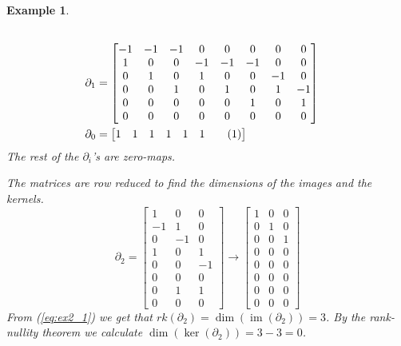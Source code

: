 \documentclass[11pt,a4paper,twoside]{report}
\newtheorem{myex}[mythm]{Example}
\newcommand\numberthis{\addtocounter{equation}{1}\tag{\theequation}}
\DeclareMathOperator{\im}{im}
\begin{document}
\begin{myex}
\begin{align*}
\\
\partial_1&=
\begin{bmatrix}
-1 & -1 & -1 & 0 & 0 & 0 & 0 & 0 \\
1 & 0 & 0 & -1 & -1 & -1 & 0 & 0 \\
0 & 1 & 0 & 1 & 0 & 0 & -1 & 0 \\
0 & 0 & 1 & 0 & 1 & 0 & 1 & -1 \\
0 & 0 & 0 & 0 & 0 & 1 & 0 & 1 \\
0 & 0 & 0 & 0 & 0 & 0 & 0 & 0 
\end{bmatrix}
\\
\partial_0&=
\begin{bmatrix}
1 & 1 & 1 & 1 & 1 & 1 \numberthis \label{eq:ex2_0}
\end{bmatrix}
\end{align*} 
The rest of the $\partial_i$'s are zero-maps.

The matrices are row reduced to find the dimensions of the images and the kernels.
\begin{equation}\label{eq:ex2_1}
\partial_2=
\begin{bmatrix}
1 & 0 & 0 \\
-1 & 1 & 0 \\
0 & -1 & 0 \\
1 & 0 & 1 \\
0 & 0 & -1 \\
0 & 0 & 0 \\
0 & 1 & 1 \\
0 & 0 & 0 
\end{bmatrix}
\to
\begin{bmatrix}
1 & 0 & 0 \\
0 & 1 & 0 \\
0 & 0 & 1 \\
0 & 0 & 0 \\
0 & 0 & 0 \\
0 & 0 & 0 \\
0 & 0 & 0 \\
0 & 0 & 0 
\end{bmatrix}
\end{equation}
From (\ref{eq:ex2_1}) we get that $rk(\partial_2)=\dim(\im(\partial_2))=3$. By the rank-nullity theorem we calculate $\dim(\ker(\partial_2))=3-3=0$.


\end{myex}
\end{document}
